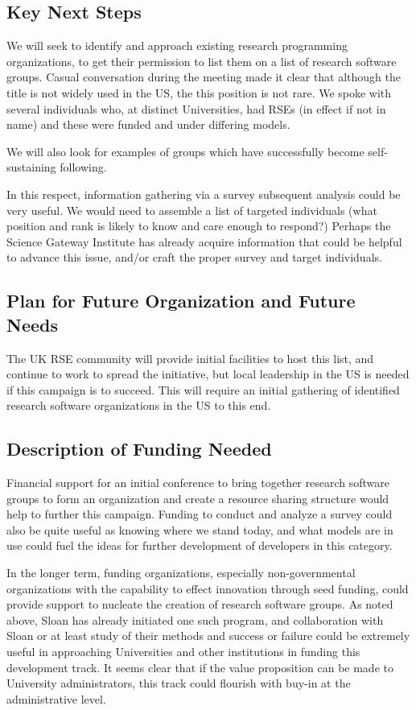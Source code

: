 \subsection{Key Next Steps}

We will seek to identify and approach existing research programming organizations,
to get their permission to list them on a list of research software groups.
Casual conversation during the meeting made it clear that although the title is not
widely used in the US, the this position is not rare. We spoke with several individuals
who, at distinct Universities, had RSEs (in effect if not in name) and these were funded
and under differing models. 

We will also look for examples of groups which have successfully become self-
sustaining following. 

In this respect, information gathering via a survey subsequent analysis could be very useful.
We would need to assemble a list of targeted individuals (what position and rank is
likely to know and care enough to respond?) Perhaps the Science Gateway Institute has already acquire
information that could be helpful to advance this issue, and/or craft the proper survey and target
individuals. 

\subsection{Plan for Future Organization and Future Needs}

The UK RSE community will provide initial facilities to host this list, and
continue to work to spread the initiative, but local leadership in the US
is needed if this campaign is to succeed. This will require an initial gathering
of identified research software organizations in the US to this end.

\subsection{Description of Funding Needed}

Financial support for an initial conference to bring together research software
groups to form an organization and create a resource sharing structure would
help to further this campaign. Funding to conduct and analyze a survey could also be quite useful
as knowing where we stand today, and what models are in use could fuel the ideas for further
development of developers in this category.

In the longer term, funding organizations, especially non-governmental organizations
with the capability to effect innovation through seed funding, could provide
support to nucleate the creation of research software groups. As noted above, Sloan has already
initiated one such program, and collaboration with Sloan or at least study of their methods and 
success or failure could be extremely useful in approaching Universities and other institutions 
in funding this development track. It seems clear that if the value proposition can be made to
University administrators, this track could flourish with buy-in at the administrative level.  

